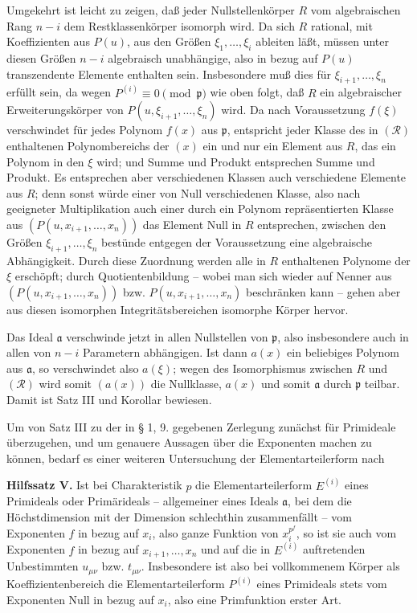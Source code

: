 \documentclass[11pt]{article}
\providecommand{\frakp}{\mathfrak p}
\providecommand{\fraka}{\mathfrak a}
\begin{document}
Umgekehrt ist leicht zu zeigen, daß jeder Nullstellenkörper $R$ vom algebraischen Rang $n-i$ dem Restklassenkörper isomorph wird. Da sich $R$ rational, mit Koeffizienten aus $P(u)$, aus den Größen $\xi_1,\ldots,\xi_i$ ableiten läßt, müssen unter diesen Größen $n-i$ algebraisch unabhängige, also in bezug auf $P(u)$ transzendente Elemente enthalten sein. Insbesondere muß dies für $\xi_{i+1},\ldots,\xi_n$ erfüllt sein, da wegen $P^{(i)}\equiv0\pmod{\frakp}$ wie oben folgt, daß $R$ ein algebraischer Erweiterungskörper von $P(u,\xi_{i+1},\ldots,\xi_n)$ wird. Da nach Voraussetzung $f(\xi)$ verschwindet für jedes Polynom $f(x)$ aus $\frakp$, entspricht jeder Klasse des in $(\mathcal R)$ enthaltenen Polynombereichs der $(x)$ ein und nur ein Element aus $R$, das ein Polynom in den $\xi$ wird; und Summe und Produkt entsprechen Summe und Produkt. Es entsprechen aber verschiedenen Klassen auch verschiedene Elemente aus $R$; denn sonst würde einer von Null verschiedenen Klasse, also nach geeigneter Multiplikation auch einer durch ein Polynom repräsentierten Klasse aus $(P(u,x_{i+1},\ldots,x_n))$ das Element Null in $R$ entsprechen, zwischen den Größen $\xi_{i+1},\ldots,\xi_n$ bestünde entgegen der Voraussetzung eine algebraische Abhängigkeit. Durch diese Zuordnung werden alle in $R$ enthaltenen Polynome der $\xi$ erschöpft; durch Quotientenbildung -- wobei man sich wieder auf Nenner aus $(P(u,x_{i+1},\ldots,x_n))$ bzw. $P(u,x_{i+1},\ldots,x_n)$ beschränken kann -- gehen aber aus diesen isomorphen Integritätsbereichen isomorphe Körper hervor.

Das Ideal $\fraka$ verschwinde jetzt in allen Nullstellen von $\frakp$, also insbesondere auch in allen von $n-i$ Parametern abhängigen. Ist dann $a(x)$ ein beliebiges Polynom aus $\fraka$, so verschwindet also $a(\xi)$; wegen des Isomorphismus zwischen $R$ und $(\mathcal R)$ wird somit $(a(x))$ die Nullklasse, $a(x)$ und somit $\fraka$ durch $\frakp$ teilbar. Damit ist Satz III und Korollar bewiesen.

Um von Satz III zu der in § 1, 9. gegebenen Zerlegung zunächst für Primideale überzugehen, und um genauere Aussagen über die Exponenten machen zu können, bedarf es einer weiteren Untersuchung der Elementarteilerform nach

\textbf{Hilfssatz V.} Ist bei Charakteristik $p$ die Elementarteilerform $E^{(i)}$ eines Primideals oder Primärideals -- allgemeiner eines Ideals $\fraka$, bei dem die Höchstdimension mit der Dimension schlechthin zusammenfällt -- vom Exponenten $f$ in bezug auf $x_i$, also ganze Funktion von $x_i^{p^f}$, so ist sie auch vom Exponenten $f$ in bezug auf $x_{i+1},\ldots,x_n$ und auf die in $E^{(i)}$ auftretenden Unbestimmten $u_{\mu\nu}$ bzw. $t_{\mu\nu}$. Insbesondere ist also bei vollkommenem Körper als Koeffizientenbereich die Elementarteilerform $P^{(i)}$ eines Primideals stets vom Exponenten Null in bezug auf $x_i$, also eine Primfunktion erster Art.
\end{document}
